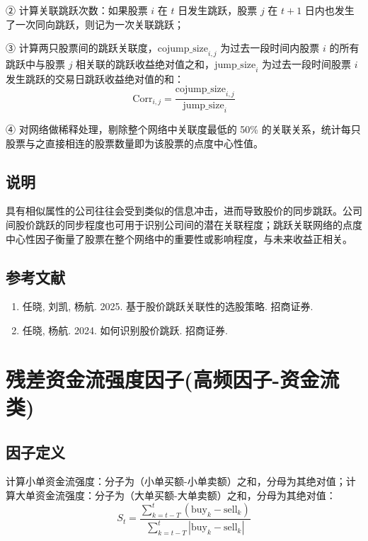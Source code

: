 \documentclass{article}
\begin{document}
② 计算关联跳跃次数：如果股票 \( i \) 在 \( t \) 日发生跳跃，股票 \( j \) 在 \( t+1 \) 日内也发生了一次同向跳跃，则记为一次关联跳跃；

③ 计算两只股票间的跳跃关联度，\( \mathrm{cojump\_size}_{i,j} \) 为过去一段时间内股票 \( i \) 的所有跳跃中与股票 \( j \) 相关联的跳跃收益绝对值之和，\( \mathrm{jump\_size}_i \) 为过去一段时间股票 \( i \) 发生跳跃的交易日跳跃收益绝对值的和：
\begin{equation}
    \mathrm{Corr}_{i,j} = \frac{\mathrm{cojump\_size}_{i,j}}{\mathrm{jump\_size}_i}
\end{equation}

④ 对网络做稀释处理，剔除整个网络中关联度最低的 50\% 的关联关系，统计每只股票与之直接相连的股票数量即为该股票的点度中心性值。

\subsection{说明}
具有相似属性的公司往往会受到类似的信息冲击，进而导致股价的同步跳跃。公司间股价跳跃的同步程度也可用于识别公司间的潜在关联程度；跳跃关联网络的点度中心性因子衡量了股票在整个网络中的重要性或影响程度，与未来收益正相关。

\subsection{参考文献}
\begin{enumerate}
    \item 任晓, 刘凯, 杨航. 2025. 基于股价跳跃关联性的选股策略. 招商证券.
    \item 任晓, 杨航. 2024. 如何识别股价跳跃. 招商证券.
\end{enumerate}

\section{残差资金流强度因子(高频因子-资金流类)}

\subsection{因子定义}

计算小单资金流强度：分子为（小单买额-小单卖额）之和，分母为其绝对值；计算大单资金流强度：分子为（大单买额-大单卖额）之和，分母为其绝对值：
\begin{equation}
    S_t = \frac{\sum_{k=t-T}^{t} (\mathrm{buy}_k - \mathrm{sell}_k)}{\sum_{k=t-T}^{t} |\mathrm{buy}_k - \mathrm{sell}_k|}
\end{equation}
\end{document}
